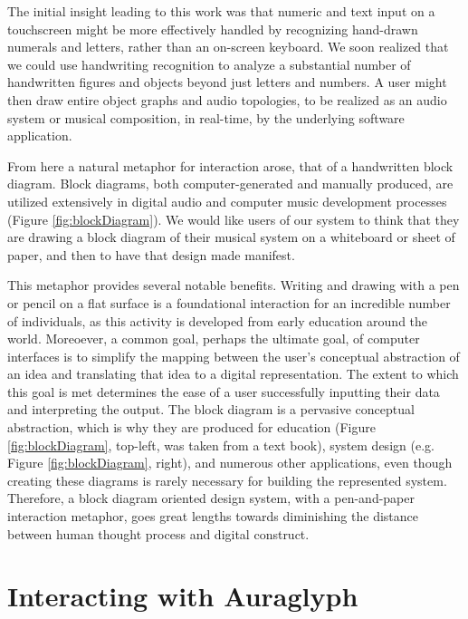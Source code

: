 \documentclass{nime-alternate}
\begin{document}
The initial insight leading to this work was that numeric and text input on a touchscreen might be more effectively handled by recognizing hand-drawn numerals and letters, rather than an on-screen keyboard. 
We soon realized that we could use handwriting recognition to analyze a substantial number of handwritten figures and objects beyond just letters and numbers. 
A user might then draw entire object graphs and audio topologies, to be realized as an audio system or musical composition, in real-time, by the underlying software application. 

From here a natural metaphor for interaction arose, that of a handwritten block diagram.
Block diagrams, both computer-generated and manually produced, are utilized extensively in digital audio and computer music development processes (Figure \ref{fig:blockDiagram}). 
We would like users of our system to think that they are drawing a block diagram of their musical system on a whiteboard or sheet of paper, and then to have that design made manifest. 

This metaphor provides several notable benefits. 
Writing and drawing with a pen or pencil on a flat surface is a foundational interaction for an incredible number of individuals, as this activity is developed from early education around the world. 
Moreoever, a common goal, perhaps the ultimate goal, of computer interfaces is to simplify the mapping between the user's conceptual abstraction of an idea and translating that idea to a digital representation. 
The extent to which this goal is met determines the ease of a user successfully inputting their data and interpreting the output. 
The block diagram is a pervasive conceptual abstraction, which is why they are produced for education (Figure \ref{fig:blockDiagram}, top-left, was taken from a text book), system design (e.g. Figure \ref{fig:blockDiagram}, right), and numerous other applications, even though creating these diagrams is rarely necessary for building the represented system. 
Therefore, a block diagram oriented design system, with a pen-and-paper interaction metaphor, goes great lengths towards diminishing the distance between human thought process and digital construct. 


\section{Interacting with Auraglyph}
\label{sec:SystemDescription}
\end{document}
